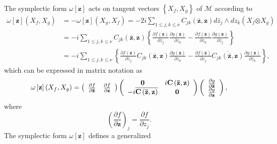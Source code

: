 \documentclass[aps,preprint]{revtex4}%
\begin{document}
The symplectic form $\omega\left[  \mathbf{z}\right]  $ acts on tangent
vectors $\left\{  X_{f},X_{g}\right\}  $ of $\mathcal{M}$ according to
\begin{align}
\omega\left[  \mathbf{z}\right]  \left(  X_{f},X_{g}\right)   &
=-\omega\left[  \mathbf{z}\right]  \left(  X_{g},X_{f}\right)  =-2i\sum_{1\leq
j,k\leq\nu}C_{jk}\left(  \mathbf{\bar{z},z}\right)  d\bar{z}_{j}\wedge
dz_{k}\left(  X_{f}\mathbf{\otimes}X_{g}\right) \nonumber\\
&  =-i\sum_{1\leq j,k\leq\nu}C_{jk}\left(  \mathbf{\bar{z},z}\right)  \left\{
\frac{\partial f\left(  \mathbf{z}\right)  }{\partial\bar{z}_{j}}%
\frac{\partial g\left(  \mathbf{z}\right)  }{\partial z_{k}}-\frac{\partial
f\left(  \mathbf{z}\right)  }{\partial z_{k}}\frac{\partial g\left(
\mathbf{z}\right)  }{\partial\bar{z}_{j}}\right\} \nonumber\\
&  =-i\sum_{1\leq j,k\leq\nu}\left\{  \frac{\partial f\left(  \mathbf{z}%
\right)  }{\partial\bar{z}_{j}}C_{jk}\left(  \mathbf{\bar{z},z}\right)
\frac{\partial g\left(  \mathbf{z}\right)  }{\partial z_{k}}-\frac{\partial
f\left(  \mathbf{z}\right)  }{\partial z_{j}}\overline{C_{jk}\left(
\mathbf{\bar{z},z}\right)  }\frac{\partial g\left(  \mathbf{z}\right)
}{\partial\bar{z}_{k}}\right\}  ,
\end{align}
which can be expressed in matrix notation as
\begin{equation}
\omega\left[  \mathbf{z}\right]  \left(  X_{f},X_{g}\right)  =\left(
\begin{array}
[c]{cc}%
\frac{\partial f}{\partial\mathbf{\bar{z}}} & \frac{\partial f}{\partial
\mathbf{z}}%
\end{array}
\right)  \left(
\begin{array}
[c]{cc}%
\mathbf{0} & i\mathbf{C}\left(  \mathbf{\bar{z},z}\right) \\
-i\overline{\mathbf{C}\left(  \mathbf{\bar{z},z}\right)  } & \mathbf{0}%
\end{array}
\right)  \left(
\begin{array}
[c]{c}%
\frac{\partial g}{\partial\mathbf{\bar{z}}}\\
\frac{\partial g}{\partial\mathbf{z}}%
\end{array}
\right)  ,
\end{equation}
where
\begin{equation}
\left(  \frac{\partial f}{\partial\mathbf{z}}\right)  _{j}=\frac{\partial
f}{\partial z_{j}}.
\end{equation}
The symplectic form $\omega\left[  \mathbf{z}\right]  $ defines a generalized
\end{document}
